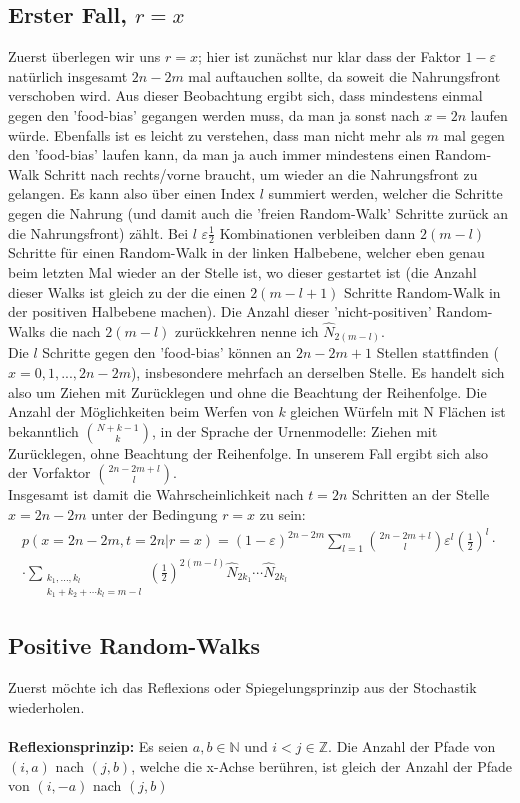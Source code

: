 \documentclass[a4paper, 12pt]{report}
\begin{document}
\subsection{Erster Fall, $r=x$}
Zuerst überlegen wir uns $r=x$; hier ist zunächst nur klar dass der Faktor $1-\varepsilon$ natürlich insgesamt $2n-2m$ mal auftauchen sollte, da soweit die Nahrungsfront verschoben wird. Aus dieser Beobachtung ergibt sich, dass mindestens einmal gegen den 'food-bias' gegangen werden muss, da man ja sonst nach $x=2n$ laufen würde. Ebenfalls ist es leicht zu verstehen, dass man nicht mehr als $m$ mal gegen den 'food-bias' laufen kann, da man ja auch immer mindestens einen Random-Walk Schritt nach rechts/vorne braucht, um wieder an die Nahrungsfront zu gelangen. Es kann also über einen Index $l$ summiert werden, welcher die Schritte gegen die Nahrung (und damit auch die 'freien Random-Walk' Schritte zurück an die Nahrungsfront) zählt. Bei $l$ $\varepsilon \frac{1}{2}$ Kombinationen verbleiben dann $2(m-l)$ Schritte für einen Random-Walk in der linken Halbebene, welcher eben genau beim letzten Mal wieder an der Stelle ist, wo dieser gestartet ist (die Anzahl dieser Walks ist gleich zu der die einen $2(m-l+1)$ Schritte Random-Walk in der positiven Halbebene machen). Die Anzahl dieser 'nicht-positiven' Random-Walks die nach $2(m-l)$ zurückkehren nenne ich $\hat{N}_{2(m-l)}$.
\\
Die $l$ Schritte gegen den 'food-bias' können an $2n-2m+1$ Stellen stattfinden ($x=0,1,...,2n-2m$), insbesondere mehrfach an derselben Stelle. Es handelt sich also um Ziehen mit Zurücklegen und ohne die Beachtung der Reihenfolge. Die Anzahl der Möglichkeiten beim Werfen von $k$ gleichen Würfeln mit N Flächen ist bekanntlich $N+k-1 \choose k$, in der Sprache der Urnenmodelle: Ziehen mit Zurücklegen, ohne Beachtung der Reihenfolge. In unserem Fall ergibt sich also der Vorfaktor $2n-2m+l \choose l$.
\\
Insgesamt ist damit die Wahrscheinlichkeit nach $t=2n$ Schritten an der Stelle $x=2n-2m$ unter der Bedingung $r=x$ zu sein:
\begin{align}
\nonumber p(x=2n-2m,t=2n|r=x) = (1-\varepsilon)^{2n-2m} \sum_{l=1}^{m}{2n-2m+l \choose l}\varepsilon^l \left(\frac{1}{2}\right)^l \cdot
\\
\cdot \sum_{\substack{k_1,...,k_l \\ k_1+k_2+\cdots k_l=m-l}} \left(\frac{1}{2}\right)^{2(m-l)} \hat{N}_{2k_1}\cdots \hat{N}_{2k_l}
\end{align}

\subsection{Positive Random-Walks}
Zuerst möchte ich das Reflexions oder Spiegelungsprinzip aus der Stochastik wiederholen.
\\
\\
\textbf{Reflexionsprinzip:}  Es seien $a,b \in \mathbb{N}$ und $i<j \in \mathbb{Z}$. Die Anzahl der Pfade von $(i,a)$ nach $(j,b)$, welche die x-Achse berühren, ist gleich der Anzahl der Pfade von $(i,-a)$ nach $(j,b)$
\end{document}
